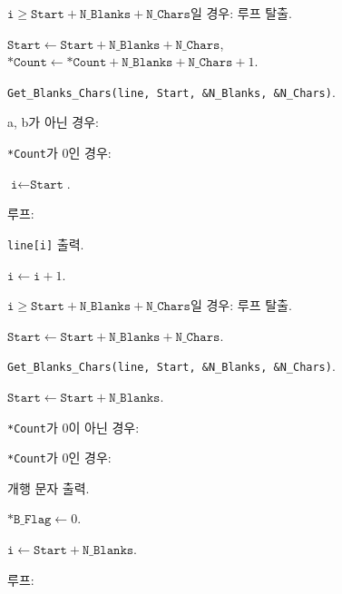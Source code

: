 \begin{algorithm}
\begin{algorithm}
\begin{algorithm}
\begin{algorithm}
								\item $\texttt{i} \geq \texttt{Start} + \texttt{N_Blanks} + \texttt{N_Chars}$일 경우: 루프 탈출.
							\end{algorithm}
						\item $\texttt{Start} \leftarrow \texttt{Start} + \texttt{N_Blanks} + \texttt{N_Chars}$, $\texttt{*Count} \leftarrow \texttt{*Count} + \texttt{N_Blanks} + \texttt{N_Chars} + 1$.
						\item \texttt{Get_Blanks_Chars(line, Start, \&N_Blanks, \&N_Chars)}.
 					\end{algorithm}
 				\item a, b가 아닌 경우:
 					\begin{algorithm}
						\item \texttt{*Count}가 0인 경우:
							\begin{algorithm}
								\item $\texttt{i} \leftarrow \texttt{Start}$.
								\item 루프:
									\begin{algorithm}
										\item \texttt{line[i]} 출력.
										\item $\texttt{i} \leftarrow \texttt{i} + 1$.
										\item $\texttt{i} \geq \texttt{Start} + \texttt{N_Blanks} + \texttt{N_Chars}$일 경우: 루프 탈출.
									\end{algorithm}
								\item $\texttt{Start} \leftarrow \texttt{Start} + \texttt{N_Blanks} + \texttt{N_Chars}$.
								\item \texttt{Get_Blanks_Chars(line, Start, \&N_Blanks, \&N_Chars)}.
								\item $\texttt{Start} \leftarrow \texttt{Start} + \texttt{N_Blanks}$.
							\end{algorithm}
						\item \texttt{*Count}가 0이 아닌 경우:
							\item \texttt{*Count}가 0인 경우:
							\begin{algorithm}
								\item 개행 문자 출력.
								\item $\texttt{*B_Flag} \leftarrow 0$.
 								\item \item $\texttt{i} \leftarrow \texttt{Start} + \texttt{N_Blanks}$.
								\item 루프:
									\begin{algorithm}

\end{algorithm}
\end{algorithm}
\end{algorithm}
\end{algorithm}
\end{algorithm}
